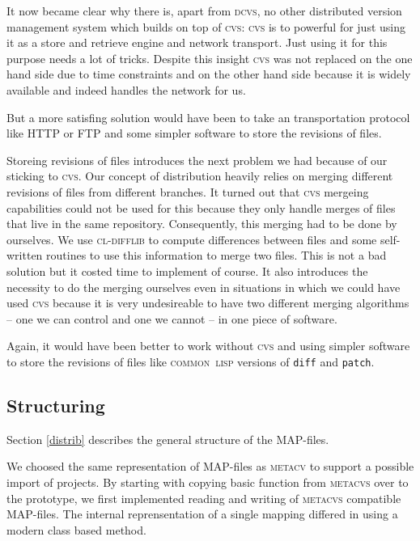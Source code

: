 \documentclass[fleqn, 10pt, a4paper]{report} \usepackage{amssymb}
\begin{document}
It now became clear why there is, apart from \textsc{dcvs}, no other
distributed version management system which builds on top of
\textsc{cvs}: \textsc{cvs} is to powerful for just using it as a store
and retrieve engine and network transport. Just using it for this
purpose needs a lot of tricks. Despite this insight \textsc{cvs} was
not replaced on the one hand side due to time constraints and on the
other hand side because it is widely available and indeed handles the
network for us.

But a more satisfing solution would have been to take an
transportation protocol like HTTP or FTP and some simpler software to
store the revisions of files.

Storeing revisions of files introduces the next problem we had because
of our sticking to \textsc{cvs}. Our concept of distribution heavily
relies on merging different revisions of files from different
branches. It turned out that \textsc{cvs} mergeing capabilities could
not be used for this because they only handle merges of files that
live in the same repository. Consequently, this merging had to be done
by ourselves. We use \textsc{cl-difflib} \cite{Cldi06} to compute differences
between files and some self-written routines to use this information
to merge two files. This is not a bad solution but it costed time to
implement of course. It also introduces the necessity to do the
merging ourselves even in situations in which we could have used
\textsc{cvs} because it is very undesireable to have two different
merging algorithms -- one we can control and one we cannot -- in one
piece of software.

Again, it would have been better to work without \textsc{cvs} and
using simpler software to store the revisions of files like
\textsc{common~lisp} versions of \texttt{diff} and \texttt{patch}.

\subsection{Structuring} 

Section \ref{distrib} describes the general structure of the MAP-files.

We choosed the same representation of MAP-files as \textsc{metacv} to
support a possible import of projects. By starting with copying basic
function from \textsc{metacvs} over to the prototype, we first
implemented reading and writing of \textsc{metacvs} compatible
MAP-files. The internal reprensentation of a single mapping differed
in using a modern class based method.
\end{document}
